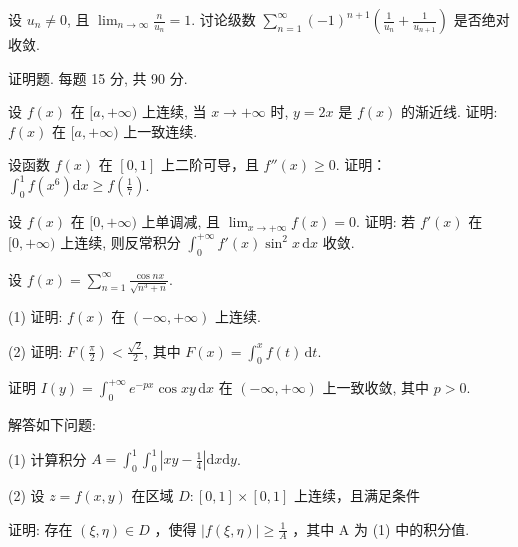 设 $u_{n} \neq 0$, 且 $\lim_{n \to \infty} \frac{n}{u_n} = 1$. 讨论级数 $\sum_{n=1}^{\infty} (-1)^{n+1} \left( \frac{1}{u_n} + \frac{1}{u_{n+1}} \right)$ 是否绝对收敛.\par
\par{}
证明题. 每题 15 分, 共 90 分.\par
设 $f(x)$ 在 $[a, +\infty)$ 上连续, 当 $x \to +\infty$ 时, $y = 2x$ 是 $f(x)$ 的渐近线. 证明: $f(x)$ 在 $[a, +\infty)$ 上一致连续.\par
设函数 $f(x)$ 在 $[0,1]$ 上二阶可导，且 $f''(x) \geq 0$. 证明：$\int_0^1 f(x^6) \mathrm{d}x \geq f\left(\frac{1}{7}\right)$.\par
设 $f(x)$ 在 $[0, +\infty)$ 上单调减, 且 $\lim_{x \to +\infty} f(x) = 0$. 证明: 若 $f'(x)$ 在 $[0, +\infty)$ 上连续, 则反常积分 $\int_0^{+\infty} f'(x) \sin^2 x \, \mathrm{d}x$ 收敛.\par
设 $f(x) = \sum_{n=1}^{\infty} \frac{\cos nx}{\sqrt{n^3 + n}}$.\par
(1) 证明: $f(x)$ 在 $(- \infty, + \infty)$ 上连续.\par
(2) 证明: $F\left(\frac{\pi}{2}\right) < \frac{\sqrt{2}}{2}$, 其中 $F(x) = \int_{0}^{x} f(t) \, \mathrm{d}t$.\par
证明 $I(y) = \int_{0}^{+\infty} e^{-px} \cos xy \, \mathrm{d}x$ 在 $(- \infty, +\infty)$ 上一致收敛, 其中 $p > 0$.\par
解答如下问题:\par
(1) 计算积分 $A = \int_{0}^{1} \int_{0}^{1} \left| xy - \frac{1}{4} \right| \mathrm{d}x \mathrm{d}y$.\par
\par{}
(2) 设 $z = f(x, y)$ 在区域 $D: [0, 1] \times [0, 1]$ 上连续，且满足条件\par
\nopagebreak[4]
证明: 存在  $(\xi,\eta)\in D$ ，使得  $|f(\xi,\eta)|\geq\frac{1}{A}$ ，其中 A 为 (1) 中的积分值.\par
